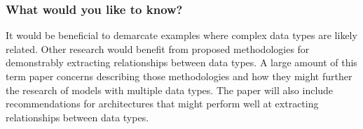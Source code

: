 \subsubsection{What would you like to know?}

It would be beneficial to demarcate examples where complex data types are likely related.  Other research would benefit from proposed methodologies for demonstrably extracting relationships between data types.  A large amount of this term paper concerns describing those methodologies and how they might further the research of models with multiple data types.  The paper will also include recommendations for architectures that might perform well at extracting relationships between data types.








